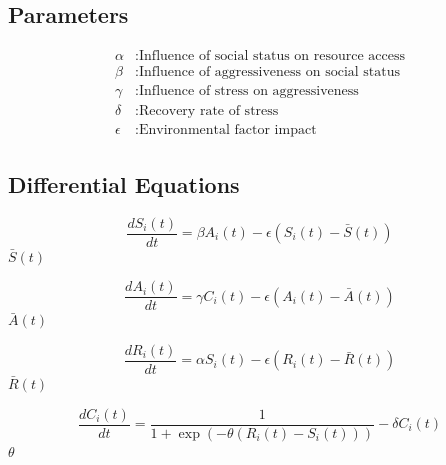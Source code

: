 \documentclass[english, a4paper, 11pt]{article}
\begin{document}
\subsection*{Parameters}
\begin{align*}
    \alpha   & : \text{Influence of social status on resource access} \\
    \beta    & : \text{Influence of aggressiveness on social status}  \\
    \gamma   & : \text{Influence of stress on aggressiveness}         \\
    \delta   & : \text{Recovery rate of stress}                       \\
    \epsilon & : \text{Environmental factor impact}
\end{align*}

\subsection*{Differential Equations}

\begin{equation}
    \frac{dS_i(t)}{dt} = \beta A_i(t) - \epsilon (S_i(t) - \bar{S}(t))
\end{equation}
 $\bar{S}(t)$ 

\begin{equation}
    \frac{dA_i(t)}{dt} = \gamma C_i(t) - \epsilon (A_i(t) - \bar{A}(t))
\end{equation}
 $\bar{A}(t)$ 

\begin{equation}
    \frac{dR_i(t)}{dt} = \alpha S_i(t) - \epsilon (R_i(t) - \bar{R}(t))
\end{equation}
 $\bar{R}(t)$ 

\begin{equation}
    \frac{dC_i(t)}{dt} = \frac{1}{1 + \exp(-\theta (R_i(t) - S_i(t)))} - \delta C_i(t)
\end{equation}
 $\theta$ 
\end{document}

